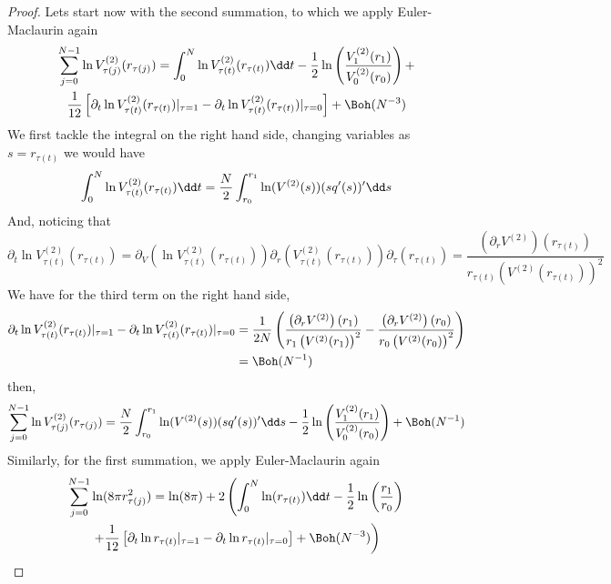 \begin{proof}
	Lets start now with the second summation, to which we apply Euler-Maclaurin again
	\begin{multline}
		\sum_{j=0}^{N-1}  \ln V^{(2)}_{\tau(j)}(r_{\tau(j)}) = \int_{0}^{N} \ln V^{(2)}_{\tau(t)}(r_{\tau(t)}) \dd t - \frac{1}{2} \ln \left( \frac{V^{(2)}_{1}(r_1)}{V^{(2)}_{0}(r_{0})} \right) + \\ \frac{1}{12} \left[ \partial_t \ln V^{(2)}_{\tau(t)}(r_{\tau(t)}) |_{\tau=1} - \partial_t \ln V^{(2)}_{\tau(t)}(r_{\tau(t)}) |_{\tau=0}\right]  + \Boh(N^{-3})
	\end{multline}
	We first tackle the integral on the right hand side, changing variables as $s = r_{\tau(t)}$ we would have
	\begin{equation}
		\int_{0}^{N} \ln V^{(2)}_{\tau(t)}(r_{\tau(t)}) \dd t = \frac{N}{2} \int_{r_0}^{r_1} \ln(V^{(2)}(s)) (sq'(s))' \dd s \\
	\end{equation}
	And, noticing that
	\begin{equation}
		\partial_t \ln V^{(2)}_{\tau(t)}(r_{\tau(t)}) = \partial_V \left( \ln V^{(2)}_{\tau(t)}(r_{\tau(t)}) \right) \partial_r \left( V^{(2)}_{\tau(t)}(r_{\tau(t)}) \right) \partial_\tau \left( r_{\tau(t)} \right) = \frac{\left(\partial_r V^{(2)}\right)(r_{\tau(t)})}{r_{\tau(t)} \left( V^{(2)}(r_{\tau(t)})\right)^2}
	\end{equation}
	We have for the third term on the right hand side, 
	\begin{align}
		\partial_t \ln V^{(2)}_{\tau(t)}(r_{\tau(t)}) |_{\tau=1} - \partial_t \ln V^{(2)}_{\tau(t)}(r_{\tau(t)}) |_{\tau=0} & = \frac{1}{2N} \left( \frac{\left(\partial_r V^{(2)}\right)(r_{1})}{r_1 \left( V^{(2)}(r_1)\right)^2} - \frac{\left(\partial_r V^{(2)}\right)(r_{0})}{r_0 \left( V^{(2)}(r_0)\right)^2}\right) \\ & = \Boh(N^{-1})
	\end{align}
	then,
	\begin{equation}
		\sum_{j=0}^{N-1}  \ln V^{(2)}_{\tau(j)}(r_{\tau(j)})  = \frac{N}{2} \int_{r_0}^{r_1} \ln(V^{(2)}(s)) (sq'(s))' \dd s  -   \frac{1}{2} \ln \left( \frac{V^{(2)}_{1}(r_1)}{V^{(2)}_{0}(r_{0})} \right) + \Boh(N^{-1})
		\label{Equation: logV annulus}
	\end{equation}
	Similarly, for the first summation, we apply Euler-Maclaurin again
	\begin{multline}
		\sum_{j=0}^{N-1}  \ln(8 \pi r^2_{\tau(j)}) = \ln(8\pi) + 2 \left( \int_{0}^{N} \ln(r_{\tau(t)})  \dd t - \frac{1}{2} \ln\left(\frac{r_1}{r_0}\right) \right. \\ \left. + \frac{1}{12} \left[ \partial_t \ln r_{\tau(t)} |_{\tau=1} - \partial_t \ln r_{\tau(t)} |_{\tau=0}\right] + \Boh(N^{-3}) \right)

\end{multline}
\end{proof}
